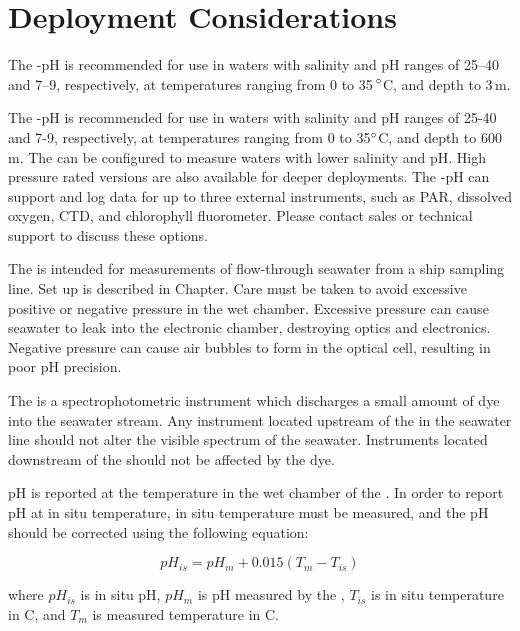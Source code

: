 \section{\instType{} Deployment Considerations}

\ifcase \inst	%

    The \instType{}-pH is recommended for use in waters with salinity and pH ranges of 25--40 and 7--9, respectively, at temperatures ranging from 0 to 35\,$\degree$C, and depth to 3\,m.

\or			%

    The \instType{}-pH is recommended for use in waters with salinity and pH ranges of 25-40 and 7-9, respectively, at temperatures ranging from 0 to 35$\degree$C, and depth to 600\,m.  The \instType{} can be configured to measure waters with lower salinity and pH. High pressure rated versions are also available for deeper deployments.  The \instType{}-pH can support and log data for up to three external instruments, such as PAR, dissolved oxygen, CTD, and chlorophyll fluorometer.  Please contact sales or technical support to discuss these options.

\or			%

The \instType{} is intended for measurements of flow-through seawater from a ship sampling line.  Set up is described in Chapter.  Care must be taken to avoid excessive positive or negative pressure in the \instType{} wet chamber.  Excessive pressure can cause seawater to leak into the electronic chamber, destroying optics and electronics.  Negative pressure can cause air bubbles to form in the optical cell, resulting in poor pH precision. 

The \instType{} is a spectrophotometric instrument which discharges a small amount of dye into the seawater stream.  Any instrument located upstream of the \instType{} in the seawater line should not alter the visible spectrum of the seawater.  Instruments located downstream of the \instType{} should not be affected by the dye.  

pH is reported at the temperature in the wet chamber of the \instType{}.  In order to report pH at in situ temperature, in situ temperature must be measured, and the pH should be corrected using the following equation:

\begin{equation}
pH_{is} = {pH_m} + 0.015 ( T_m - T_{is} )
\end{equation}

where $pH_{is}$ is in situ pH, $pH_m$ is pH measured by the \instType{}, $T_{is}$ is in situ temperature in C, and $T_m$ is measured temperature in C.

